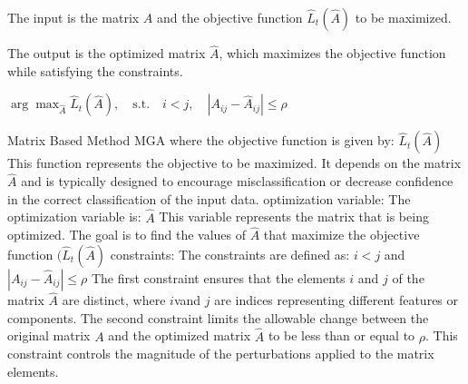 The input is the matrix \(A\) and the objective function \(\hat{L}_t(\hat{A})\) to be maximized.

The output is the optimized matrix \(\hat{A}\), which maximizes the objective function while satisfying the constraints.

$\arg \max_{\hat{A}} \hat{L}_t(\hat{A}), \quad \text{s.t.} \quad i < j, \quad |A_{ij} - \hat{A}_{ij}| \leq \rho$

Matrix Based Method MGA where the objective function is given by:
$\hat{L}_t(\hat{A})$
This function represents the objective to be maximized. It depends on the matrix \(\hat{A}\) and is typically designed to encourage misclassification or decrease confidence in the correct classification of the input data.
optimization variable:
The optimization variable is:
$\hat{A}$
This variable represents the matrix that is being optimized. The goal is to find the values of $\hat{A}$ that maximize the objective function $(\hat{L}_t(\hat{A})$
constraints:
The constraints are defined as:
$i < j$
and
$|A_{ij} - \hat{A}_{ij}| \leq \rho$
The first constraint ensures that the elements $i$ and $j$ of the matrix $\hat{A}$ are distinct, where $i$vand $j$ are indices representing different features or components. The second constraint limits the allowable change between the original matrix $A$ and the optimized matrix $\hat{A}$ to be less than or equal to $\rho$. This constraint controls the magnitude of the perturbations applied to the matrix elements.
